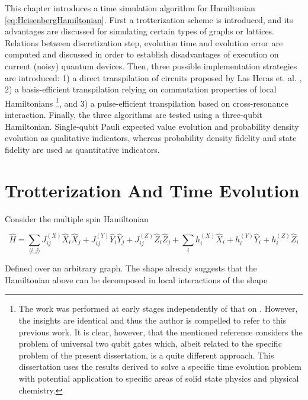 This chapter introduces a time simulation algorithm for Hamiltonian \ref{eq:HeisenbergHamiltonian}. First a trotterization scheme is introduced, and its advantages are discussed for simulating certain types of graphs or lattices. Relations between discretization step, evolution time and evolution error are computed and discussed in order to establish disadvantages of execution on current (noisy) quantum devices. Then, three possible implementation strategies are introduced: 1) a direct transpilation of circuits proposed by Las Heras et. al. \cite{HubbardSimulLasHeras}, 2) a basis-efficient transpilation relying on commutation properties of local Hamiltonians \footnote{The work was performed at early stages independently of that on \cite{BellUniversalCartan}. However, the insights are identical and thus the author is compelled to refer to this previous work. It is clear, however, that the mentioned reference considers the problem of universal two qubit gates which, albeit related to the specific problem of the present dissertation, is a quite different approach. This dissertation uses the results derived to solve a specific time evolution problem with potential application to specific areas of solid state physics and physical chemistry.}, and 3) a pulse-efficient transpilation based on cross-resonance interaction. Finally, the three algorithms are tested using a three-qubit Hamiltonian. Single-qubit Pauli expected value evolution and probability density evolution as qualitative indicators, whereas probability density fidelity and state fidelity are used as quantitative indicators.

\section{Trotterization And Time Evolution}
\label{sec:MainTrotterScheme}

  Consider the multiple spin Hamiltonian

  \begin{equation}
    \hat{H} = \sum_{\langle i,j \rangle} J_{ij}^{(X)} \hat{X}_i \hat{X}_j + J_{ij}^{(Y)} \hat{Y}_i \hat{Y}_j + J_{ij}^{(Z)} \hat{Z}_i \hat{Z}_j + \sum_i h_i^{(X)} \hat{X}_i + h_i^{(Y)} \hat{Y}_i + h_i^{(Z)} \hat{Z}_i
    \label{eq:HeisenbergHamiltonian2}
  \end{equation}

  Defined over an arbitrary graph. The shape already suggests that the Hamiltonian above can be decomposed in local interactions of the shape

